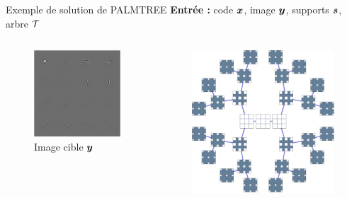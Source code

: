 \begin{frame}{Exemple de solution de PALMTREE}
\textbf{Entrée :} code $\bm{x}$, image $\bm{y}$, supports $\bm{s}$, arbre $\mathcal T$
\begin{columns}
\begin{column}{0.32\textwidth} \begin{figure}\centering
	\includegraphics[width=\textwidth]{figures/tree-learn-setup/target.pdf} \caption{Image cible $\bm{y}$}
\end{figure}\end{column}
\begin{column}{0.32\textwidth} \begin{figure}\centering
	\includegraphics[width=\textwidth]{figures/tree-learn-setup/xp_learnsupp256_curvelet_decomp3[tree-binary_dpth4]_supp-generic3x3_[fixed-supports]_tree.pdf}

\end{figure}
\end{column}
\end{columns}
\end{frame}
